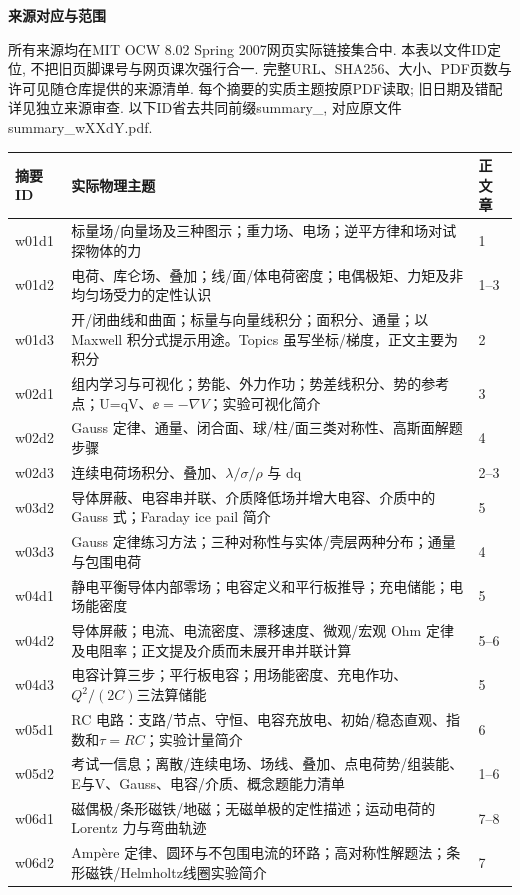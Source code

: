 \clearpage
{}
\begin{center}{\bfseries 来源对应与范围}\end{center}
所有来源均在MIT OCW 8.02 Spring 2007网页实际链接集合中. 本表以文件ID定位, 不把旧页脚课号与网页课次强行合一. 完整URL、SHA256、大小、PDF页数与许可见随仓库提供的来源清单. 每个摘要的实质主题按原PDF读取; 旧日期及错配详见独立来源审查. 以下ID省去共同前缀summary\_, 对应原文件summary\_wXXdY.pdf.
\begin{longtable}{p{.13\linewidth}p{.68\linewidth}p{.10\linewidth}}
\toprule 摘要ID & 实际物理主题 & 正文章\\\midrule\endhead
w01d1 & 标量场/向量场及三种图示；重力场、电场；逆平方律和场对试探物体的力 & 1\\
w01d2 & 电荷、库仑场、叠加；线/面/体电荷密度；电偶极矩、力矩及非均匀场受力的定性认识 & 1--3\\
w01d3 & 开/闭曲线和曲面；标量与向量线积分；面积分、通量；以 Maxwell 积分式提示用途。Topics 虽写坐标/梯度，正文主要为积分 & 2\\
w02d1 & 组内学习与可视化；势能、外力作功；势差线积分、势的参考点；U=qV、$\ee=-\nabla V$；实验可视化简介 & 3\\
w02d2 & Gauss 定律、通量、闭合面、球/柱/面三类对称性、高斯面解题步骤 & 4\\
w02d3 & 连续电荷场积分、叠加、$\lambda/\sigma/\rho$ 与 dq & 2--3\\
w03d2 & 导体屏蔽、电容串并联、介质降低场并增大电容、介质中的 Gauss 式；Faraday ice pail 简介 & 5\\
w03d3 & Gauss 定律练习方法；三种对称性与实体/壳层两种分布；通量与包围电荷 & 4\\
w04d1 & 静电平衡导体内部零场；电容定义和平行板推导；充电储能；电场能密度 & 5\\
w04d2 & 导体屏蔽；电流、电流密度、漂移速度、微观/宏观 Ohm 定律及电阻率；正文提及介质而未展开串并联计算 & 5--6\\
w04d3 & 电容计算三步；平行板电容；用场能密度、充电作功、$Q^2/(2C)$三法算储能 & 5\\
w05d1 & RC 电路：支路/节点、守恒、电容充放电、初始/稳态直观、指数和$\tau=RC$；实验计量简介 & 6\\
w05d2 & 考试一信息；离散/连续电场、场线、叠加、点电荷势/组装能、E与V、Gauss、电容/介质、概念题能力清单 & 1--6\\
w06d1 & 磁偶极/条形磁铁/地磁；无磁单极的定性描述；运动电荷的 Lorentz 力与弯曲轨迹 & 7--8\\
w06d2 & Ampère 定律、圆环与不包围电流的环路；高对称性解题法；条形磁铁/Helmholtz线圈实验简介 & 7\\

\end{longtable}
